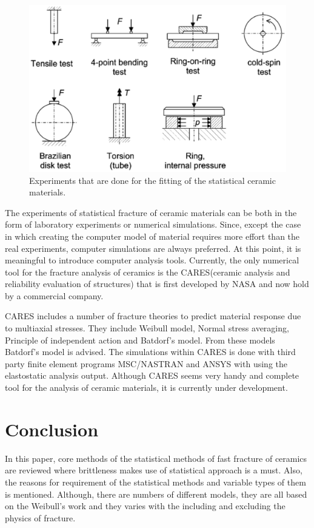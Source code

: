 \documentclass[]{article}
\begin{document}
\begin{figure}[ht!]
\centering
\includegraphics[width=0.7\linewidth]{./Figures/experiments}
\caption{Experiments that are done for the fitting of the statistical ceramic materials\cite{Sheunemann}.}
\label{fig:experiments}
\end{figure}
 

The experiments of statistical fracture of ceramic materials can be both in the form of laboratory experiments or numerical simulations. 
Since, except the case in which creating the computer model of material requires more effort than the real experiments, 
computer simulations are always preferred. At this point, it is meaningful to introduce computer analysis tools. 
Currently, the only numerical tool for the fracture analysis of ceramics is the CARES(ceramic analysis and 
reliability evaluation of structures)\cite{nemeth} that is first developed by NASA and now hold by a commercial company.

CARES includes a number of fracture theories to predict material response due to multiaxial stresses. They include Weibull model, Normal stress averaging, Principle of independent action and Batdorf's model. From these models Batdorf's model is advised. The simulations within CARES is done with third party finite element programs MSC/NASTRAN and ANSYS with using the elastostatic analysis output. Although CARES seems very handy and complete tool for the analysis of ceramic materials, it is currently under development.
\section*{Conclusion}
In this paper, core methods of the statistical methods of fast fracture of ceramics are reviewed where brittleness makes use of statistical approach is a must. Also, the reasons for requirement of the statistical methods and variable types of them is mentioned. Although, there are numbers of different models, they are all based on the Weibull's work and they varies with the including and excluding the physics of fracture.




\end{document}
